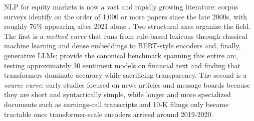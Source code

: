 NLP for equity markets is now a vast and rapidly growing literature: corpus surveys identify on the order of 1,000 or more papers since the late 2000s, with roughly 76\% appearing after 2021 alone \citep{lis2024investor}. Two structural axes organize the field. The first is a \textit{method curve} that runs from rule-based lexicons through classical machine learning and dense embeddings to BERT-style encoders and, finally, generative LLMs; \cite{mishev2020evaluation} provide the canonical benchmark spanning this entire arc, testing approximately 30 sentiment models on financial text and finding that transformers dominate accuracy while sacrificing transparency. The second is a \textit{source curve}: early studies focused on news articles and message boards because they are short and syntactically simple, while longer and more specialized documents such as earnings-call transcripts and 10-K filings only became tractable once transformer-scale encoders arrived around 2019-2020.
